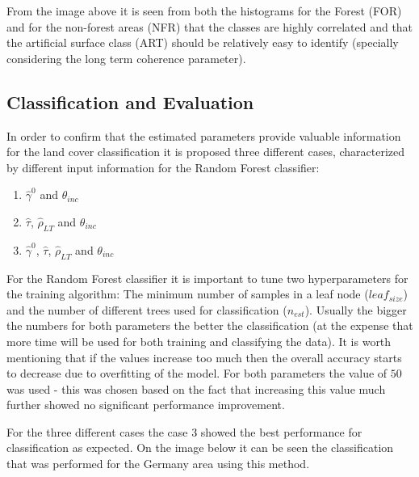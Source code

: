 From the image above it is seen from both the histograms for the Forest (FOR) and for the non-forest areas (NFR) that the classes are highly correlated and that the artificial surface class (ART) should be relatively easy to identify (specially considering the long term coherence parameter).

\subsection{Classification and Evaluation}
In order to confirm that the estimated parameters provide valuable information for the land cover classification it is proposed three different cases, characterized by different input information for the Random Forest classifier:

\begin{enumerate}
    \item  $\hat{\gamma}^0$ and $\theta_{inc}$
    \item  $\hat{\tau}$, $\hat{\rho}_{LT}$ and $\theta_{inc}$
    \item $\hat{\gamma}^0$, $\hat{\tau}$, $\hat{\rho}_{LT}$ and $\theta_{inc}$
\end{enumerate}

For the Random Forest classifier it is important to tune two hyperparameters for the training algorithm: The minimum number of samples in a leaf node ($leaf_{size}$) and the number of different trees used for classification ($n_{est}$). Usually the bigger the numbers for both parameters the better the classification (at the expense that more time will be used for both training and classifying the data). It is worth mentioning that if the values increase too much then the overall accuracy starts to decrease due to overfitting of the model. For both parameters the value of $50$ was used - this was chosen based on the fact that increasing this value much further showed no significant performance improvement.

For the three different cases the case 3 showed the best performance for classification as expected. On the image below it can be seen the classification that was performed for the Germany area using this method.

